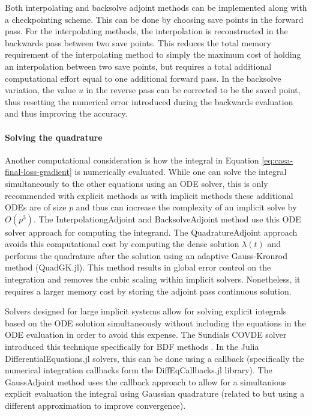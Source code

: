 Both interpolating and backsolve adjoint methods can be implemented along with a checkpointing scheme. 
This can be done by choosing save points in the forward pass. 
For the interpolating methods, the interpolation is reconstructed in the backwards pass between two save points. 
This reduces the total memory requirement of the interpolating method to simply the maximum cost of holding an interpolation between two save points, but requires a total additional computational effort equal to one additional forward pass. 
In the backsolve variation, the value $u$ in the reverse pass can be corrected to be the saved point, thus resetting the numerical error introduced during the backwards evaluation and thus improving the accuracy.

\paragraph{Solving the quadrature}

Another computational consideration is how the integral in Equation \eqref{eq:casa-final-loss-gradient} is numerically evaluated. While one can solve the integral simultaneously to the other equations using an ODE solver, this is only recommended with explicit methods as with implicit methods these additional ODEs are of size $p$ and thus can increase the complexity of an implicit solve by $O(p^3)$. The InterpolationgAdjoint and BacksolveAdjoint method use this ODE solver approach for computing the integrand. The QuadratureAdjoint approach avoids this computational cost by computing the dense solution $\lambda(t)$ and performs the quadrature after the solution using an adaptive Gauss-Kronrod method (QuadGK.jl). This method results in global error control on the integration and removes the cubic scaling within implicit solvers. Nonetheless, it requires a larger memory cost by storing the adjoint pass continuous solution.

Solvers designed for large implicit systems allow for solving explicit integrals based on the ODE solution simultaneously without including the equations in the ODE evaluation in order to avoid this expense. The Sundials COVDE solver introduced this technique specifically for BDF methods \cite{SUNDIALS-hindmarsh2005sundials}. In the Julia DifferentialEquations.jl solvers, this can be done using a callback (specifically the numerical integration callbacks form the DiffEqCallbacks.jl library). The GaussAdjoint method uses the callback approach to allow for a simultanious explicit evaluation the integral using Gaussian quadrature (related to \cite{Norcliffe_gaussquadrature_2023} but using a different approximation to improve convergence).

